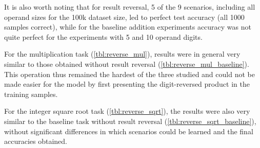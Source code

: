 It is also worth noting that for result reversal, 5 of the 9 scenarios, including all operand sizes for the 100k dataset size, led to perfect test accuracy (all 1000 samples correct), while for the baseline addition experiments accuracy was not quite perfect for the experiments with 5 and 10 operand digits.

For the multiplication task (\cref{tbl:reverse_mul}), results were in general very similar to those obtained without result reversal (\cref{tbl:reverse_mul_baseline}). This operation thus remained the hardest of the three studied and could not be made easier for the model by first presenting the digit-reversed product in the training samples.

For the integer square root task (\cref{tbl:reverse_sqrt}), the results were also very similar to the baseline task without result reversal (\cref{tbl:reverse_sqrt_baseline}), without significant differences in which scenarios could be learned and  the final accuracies obtained.

\begin{table}[!htbp]
	\begin{minipage}[t]{0.47\linewidth}
		\hfill
		\label{tbl:reverse_add_baseline}
	\end{minipage}
	\hfill %
	\begin{minipage}[t]{0.47\linewidth}
		\hfill
		\label{tbl:reverse_add}
	\end{minipage}
\end{table}

\begin{table}[!htbp]
	\begin{minipage}[t]{0.47\linewidth}
		\hfill
		\label{tbl:reverse_mul_baseline}
	\end{minipage}
	\hfill %
	\begin{minipage}[t]{0.47\linewidth}
		\hfill
		\label{tbl:reverse_mul}
	\end{minipage}
\end{table}

